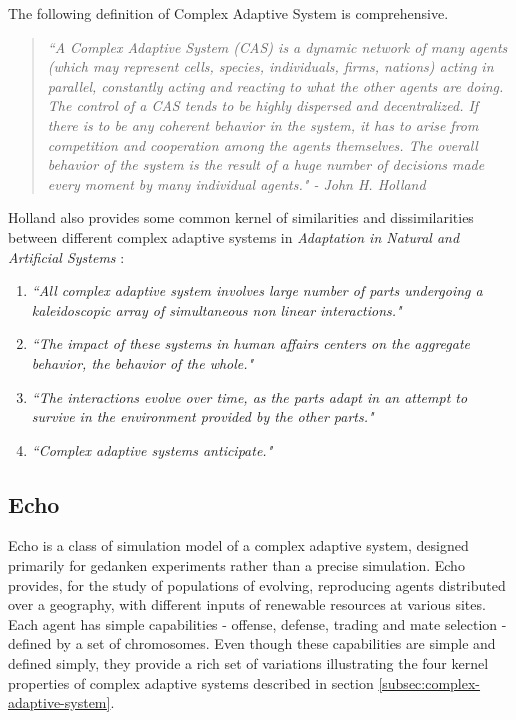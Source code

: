 The following definition of Complex Adaptive System is comprehensive.

\begin{quote}
\textsl{``A Complex Adaptive System (CAS) is a dynamic network of many agents (which may represent cells, species, individuals, firms, nations) acting in parallel, constantly acting and reacting to what the other agents are doing. The control of a CAS tends to be highly dispersed and decentralized. If there is to be any coherent behavior in the system, it has to arise from competition and cooperation among the agents themselves. The overall behavior of the system is the result of a huge number of decisions made every moment by many individual agents." - John H. Holland}
\end{quote}

Holland also provides some common kernel of similarities and dissimilarities between different complex adaptive systems in \textsl{Adaptation in Natural and Artificial Systems} \cite{holland1975}:

\begin{enumerate}
	\item \textsl{``All complex adaptive system involves large number of parts undergoing a kaleidoscopic array of simultaneous non linear interactions."}
	\item \textsl{``The impact of these systems in human affairs centers on the aggregate behavior, the behavior of the whole."}
	\item \textsl{``The interactions evolve over time, as the parts adapt in an attempt to survive in the environment provided by the other parts."}
	\item \textsl{``Complex adaptive systems anticipate."}
\end{enumerate}

\subsection{Echo}
Echo is a class of simulation model of a complex adaptive system, designed primarily for gedanken experiments rather than a precise simulation. Echo provides, for the study of populations of evolving, reproducing agents distributed over a geography, with different inputs of renewable resources at various sites. Each agent has simple capabilities - offense, defense, trading and mate selection - defined by a set of chromosomes. Even though these capabilities are simple and defined simply, they provide a rich set of variations illustrating the four kernel properties of complex adaptive systems described in section \ref{subsec:complex-adaptive-system}.

